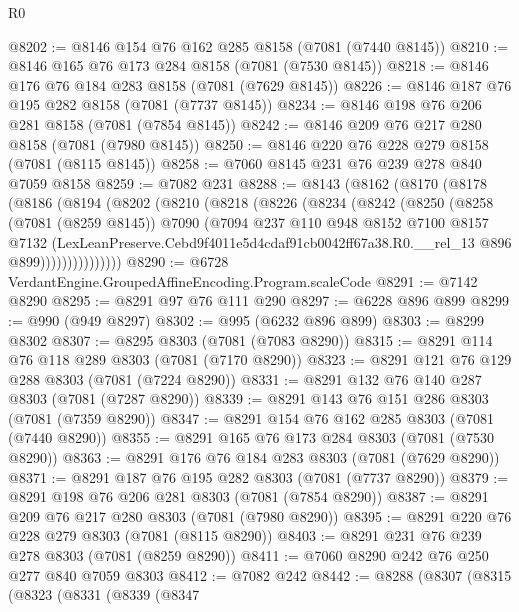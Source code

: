 \begin{lexlean}{R0}
\begin{coremodule}
@8202 := @8146 @154 @76 @162 @285 @8158 (@7081 (@7440 @8145))
@8210 := @8146 @165 @76 @173 @284 @8158 (@7081 (@7530 @8145))
@8218 := @8146 @176 @76 @184 @283 @8158 (@7081 (@7629 @8145))
@8226 := @8146 @187 @76 @195 @282 @8158 (@7081 (@7737 @8145))
@8234 := @8146 @198 @76 @206 @281 @8158 (@7081 (@7854 @8145))
@8242 := @8146 @209 @76 @217 @280 @8158 (@7081 (@7980 @8145))
@8250 := @8146 @220 @76 @228 @279 @8158 (@7081 (@8115 @8145))
@8258 := @7060 @8145 @231 @76 @239 @278 @840 @7059 @8158
@8259 := @7082 @231
@8288 := @8143
    (@8162
      (@8170
        (@8178
          (@8186
            (@8194
              (@8202
                (@8210
                  (@8218
                    (@8226
                      (@8234
                        (@8242
                          (@8250
                            (@8258
                              (@7081 (@8259 @8145))
                              @7090
                              (@7094
                                @237
                                @110
                                @948
                                @8152
                                @7100
                                @8157
                                @7132
                                (LexLeanPreserve.Cebd9f4011e5d4cdaf91cb0042ff67a38.R0.__rel_13
                                  @896
                                  @899)))))))))))))))
@8290 := @6728 VerdantEngine.GroupedAffineEncoding.Program.scaleCode
@8291 := @7142 @8290
@8295 := @8291 @97 @76 @111 @290
@8297 := @6228 @896 @899
@8299 := @990 (@949 @8297)
@8302 := @995 (@6232 @896 @899)
@8303 := @8299 @8302
@8307 := @8295 @8303 (@7081 (@7083 @8290))
@8315 := @8291 @114 @76 @118 @289 @8303 (@7081 (@7170 @8290))
@8323 := @8291 @121 @76 @129 @288 @8303 (@7081 (@7224 @8290))
@8331 := @8291 @132 @76 @140 @287 @8303 (@7081 (@7287 @8290))
@8339 := @8291 @143 @76 @151 @286 @8303 (@7081 (@7359 @8290))
@8347 := @8291 @154 @76 @162 @285 @8303 (@7081 (@7440 @8290))
@8355 := @8291 @165 @76 @173 @284 @8303 (@7081 (@7530 @8290))
@8363 := @8291 @176 @76 @184 @283 @8303 (@7081 (@7629 @8290))
@8371 := @8291 @187 @76 @195 @282 @8303 (@7081 (@7737 @8290))
@8379 := @8291 @198 @76 @206 @281 @8303 (@7081 (@7854 @8290))
@8387 := @8291 @209 @76 @217 @280 @8303 (@7081 (@7980 @8290))
@8395 := @8291 @220 @76 @228 @279 @8303 (@7081 (@8115 @8290))
@8403 := @8291 @231 @76 @239 @278 @8303 (@7081 (@8259 @8290))
@8411 := @7060 @8290 @242 @76 @250 @277 @840 @7059 @8303
@8412 := @7082 @242
@8442 := @8288
    (@8307
      (@8315
        (@8323
          (@8331
            (@8339
              (@8347

\end{coremodule}
\end{lexlean}
